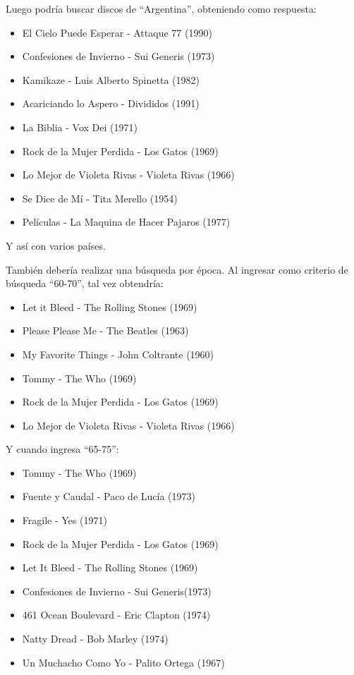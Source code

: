 Luego podría buscar discos de ``Argentina'', obteniendo como respuesta:
\begin{itemize}
  \item El Cielo Puede Esperar - Attaque 77 (1990)
  \item Confesiones de Invierno - Sui Generis (1973)
  \item Kamikaze - Luis Alberto Spinetta (1982)
  \item Acariciando lo Aspero - Divididos (1991)
  \item La Biblia - Vox Dei (1971)
	\item Rock de la Mujer Perdida - Los Gatos (1969)
	\item Lo Mejor de Violeta Rivas - Violeta Rivas (1966)
	\item Se Dice de Mí - Tita Merello (1954)
	\item Películas - La Maquina de Hacer Pajaros (1977)
\end{itemize} 
Y así con varios países.

También debería realizar una búsqueda por época. Al ingresar como criterio de búsqueda ``60-70'', tal vez obtendría:
\begin{itemize}
	\item Let it Bleed - The Rolling Stones (1969)
	\item Please Please Me - The Beatles (1963)
	\item My Favorite Things - John Coltrante (1960)
	\item Tommy - The Who (1969)
	\item Rock de la Mujer Perdida - Los Gatos (1969)
	\item Lo Mejor de Violeta Rivas - Violeta Rivas (1966)
\end{itemize}

Y cuando ingresa ``65-75'':
\begin{itemize}
	\item Tommy - The Who (1969)
	\item Fuente y Caudal - Paco de Lucía (1973)
	\item Fragile - Yes (1971)
	\item Rock de la Mujer Perdida - Los Gatos (1969)
	\item Let It Bleed - The Rolling Stones (1969)
	\item Confesiones de Invierno - Sui Generis(1973)
	\item 461 Ocean Boulevard - Eric Clapton (1974)
	\item Natty Dread - Bob Marley (1974)
	\item Un Muchacho Como Yo - Palito Ortega (1967)
\end{itemize}



